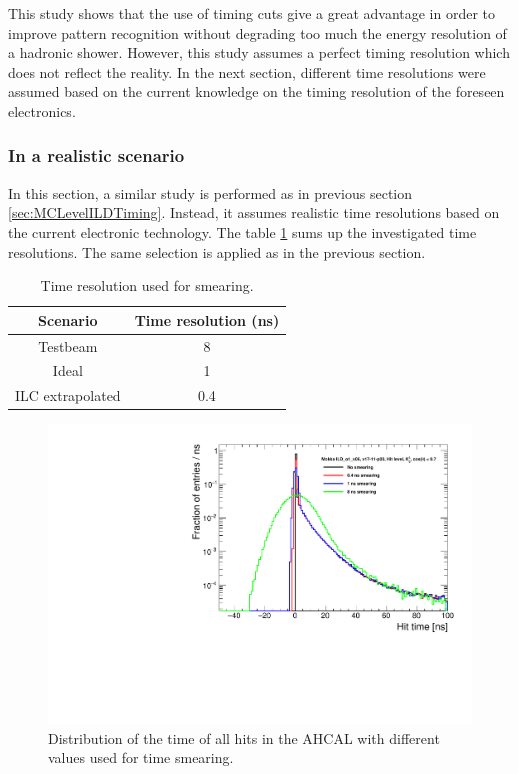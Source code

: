 This study shows that the use of timing cuts give a great advantage in order to improve pattern recognition without degrading too much the energy resolution of a hadronic shower. However, this study assumes a perfect timing resolution which does not reflect the reality. In the next section, different time resolutions were assumed based on the current knowledge on the timing resolution of the foreseen electronics.

\subsubsection{In a realistic scenario}

In this section, a similar study is performed as in previous section \ref{sec:MCLevelILDTiming}. Instead, it assumes realistic time resolutions based on the current electronic technology. The table \ref{table:TimeReso} sums up the investigated time resolutions. The same selection is applied as in the previous section.

\begin{table}[htb!]
  \centering
  \caption{Time resolution used for smearing.} \label{table:TimeReso}
  \begin{tabular}{|c|c|}
    \hline
    Scenario & Time resolution (ns) \\
    \hline
    Testbeam & 8 \\
    Ideal & 1 \\
    ILC extrapolated & 0.4 \\
    \hline
  \end{tabular}
\end{table}

\begin{figure}[htbp!]
  \centering
  \includegraphics[width=0.7\linewidth]{../Thesis_Plots/ILD/TimeDistribution/Plots/ComparisonSmearingTimingAHCAL}
  \caption{Distribution of the time of all hits in the AHCAL with different values used for time smearing.} \label{fig:SmearingAHCAL}
\end{figure}

